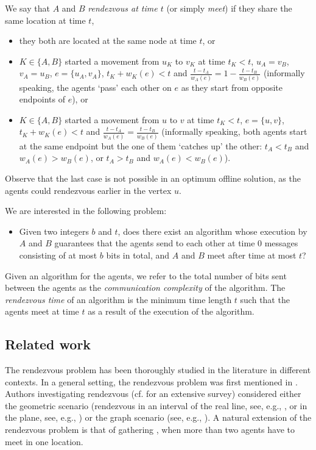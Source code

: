 \documentclass{llncs}
\newcommand{\agentVariable}{K}
\begin{document}
We say that $A$ and $B$ \emph{rendezvous at time $t$} 
(or simply \emph{meet}) if they share the same location at time $t$,
\begin{itemize}
 \item they both are located at the same node at time $t$, or
 \item ${\agentVariable}\in\{A,B\}$ started a movement from $u_{\agentVariable}$ to $v_{\agentVariable}$ at time $t_{\agentVariable}<t$, $u_A=v_B$, $v_A=u_B$, $e=\{u_A,v_A\}$, $t_{\agentVariable}+w_{\agentVariable}(e)<t$ and $\frac{t-t_A}{w_A(e)}=1-\frac{t-t_B}{w_B(e)}$ (informally speaking, the agents `pass' each other on $e$ as they start from opposite endpoints of $e$), or
 \item ${\agentVariable}\in\{A,B\}$ started a movement from $u$ to $v$ at time $t_{\agentVariable}<t$, $e=\{u,v\}$, $t_{\agentVariable}+w_{\agentVariable}(e)<t$ and $\frac{t-t_A}{w_A(e)}=\frac{t-t_B}{w_B(e)}$ (informally speaking, both agents start at the same endpoint but the one of them `catches up' the other: $t_A<t_B$ and $w_A(e)>w_B(e)$, or $t_A>t_B$ and $w_A(e)<w_B(e)$).
\end{itemize}

Observe that the last case is not possible in an optimum offline solution, as the agents could rendezvous earlier in the vertex $u$.

\noindent
We are interested in the following problem:
\begin{itemize}
 \item[] Given two integers $b$ and $t$, does there exist an algorithm whose execution by $A$ and $B$ guarantees that the agents send to each other at time $0$ messages consisting of at most $b$ bits in total, and $A$ and $B$ meet after time at most $t$?
\end{itemize}

Given an algorithm for the agents, we refer to the total number of bits sent between the agents as the \emph{communication complexity} of the algorithm.
The \emph{rendezvous time} of an algorithm is the minimum time length $t$ such that the agents meet at time $t$ as a result of the execution of the algorithm.

\subsection{Related work}
The rendezvous problem has been thoroughly studied in the literature in different contexts.
In a general setting, the rendezvous problem was first mentioned in \cite{schelling60}. 
Authors investigating  rendezvous (cf.\cite{opac-b1117985} for an extensive survey) considered either the geometric scenario (rendezvous in an interval of the real line, see, e.g.,  \cite{baston98,BasG01,gal99}, 
or in the plane, see, e.g., \cite{anderson98a,anderson98b}) or the graph scenario (see, e.g.,  \cite{DessmarkFKP06,FP08,KM}). 
A natural extension of the rendezvous problem is that of gathering \cite{FPSW05,IJ90,lim96,thomas92}, 
when more than two agents have to meet in one location.
\end{document}
